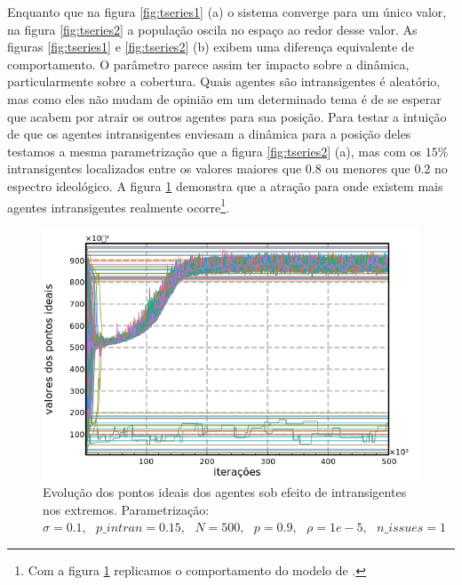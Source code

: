     Enquanto que na figura \ref{fig:tseries1} (a) o sistema converge para um
    único valor, na figura \ref{fig:tseries2} a população oscila no espaço ao
    redor desse valor. As figuras \ref{fig:tseries1} e \ref{fig:tseries2} (b)
    exibem uma diferença equivalente de comportamento. O parâmetro parece assim
    ter impacto sobre a dinâmica, particularmente sobre a cobertura. Quais
    agentes são intransigentes é aleatório, mas como eles não mudam de opinião
    em um determinado tema é de se esperar que acabem por atrair os outros
    agentes para sua posição. Para testar a intuição de que os agentes
    intransigentes enviesam a dinâmica para a posição deles testamos a mesma
    parametrização que a figura \ref{fig:tseries2} (a), mas com os \(15\%\)
    intransigentes localizados entre os valores maiores que 0.8 ou menores que
    0.2 no espectro ideológico. A figura \ref{fig:tseries3} demonstra que a
    atração para onde existem mais agentes intransigentes realmente
    ocorre\footnote{Com a figura \ref{fig:tseries3} replicamos o comportamento
      do modelo de .}.

      \begin{figure}[H]
    \centering
    \includegraphics[scale=0.7]{ims/sigma01extremes.png}
    \caption{ Evolução dos pontos ideais dos agentes sob efeito de
      intransigentes nos extremos. Parametrização: \( \sigma = 0.1, \text{ }
      p\_intran = 0.15, \text{ } N = 500, \text{ } p = 0.9, \text{ } \rho = 1e-5,
      \text{ } n\_issues = 1 \)}
    \label{fig:tseries3}
  \end{figure}

